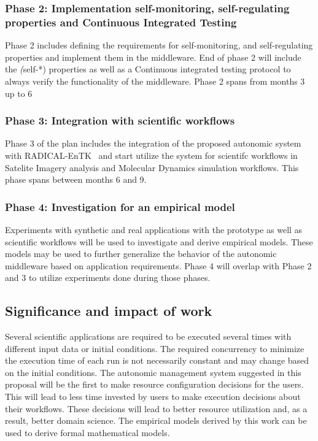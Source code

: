 {\subsubsection{Phase 2: Implementation self-monitoring, self-regulating properties
and Continuous Integrated Testing}
Phase 2 includes defining the requirements for self-monitoring, and self-regulating 
properties and implement them in the middleware. End of phase 2 will include the 
\textit(self-*) properties as well as a Continuous integrated testing protocol to 
always verify the functionality of the middleware. Phase 2 spans from months 3 up 
to 6

\subsubsection{Phase 3: Integration with scientific workflows}
Phase 3 of the plan includes the integration of the proposed autonomic system with 
RADICAL-EnTK~\cite{balasubramanian2018harnessing} and start utilize the system for 
scientifc workflows in Satelite Imagery analysis and Molecular Dynamics simulation 
workflows. This phase spans between months 6 and 9.

\subsubsection{Phase 4: Investigation for an empirical model}

Experiments with synthetic and real applications with the prototype as well as 
scientific workflows will be used to investigate and derive empirical models. 
These models may be used to further generalize the behavior of the autonomic 
middleware based on application requirements. Phase 4 will overlap with Phase 2 
and 3 to utilize experiments done during those phases.

\subsection{Significance and impact of work}
Several scientific applications are required to be executed several times with 
different input data or initial conditions. The required concurrency to minimize 
the execution time of each run is not necessarily constant and may change based 
on the initial conditions. The autonomic management system suggested in this 
proposal will be the first to make resource configuration decisions for the users. 
This will lead to less time invested by users to make execution decisions about 
their workflows. These decisions will lead to better resource utilization and, 
as a result, better domain science. The empirical models derived by this work can 
be used to derive formal mathematical models.

}
